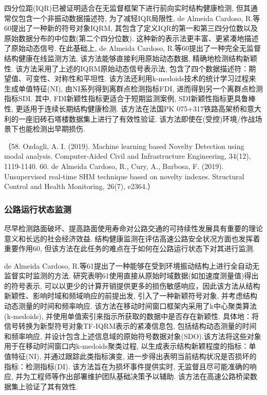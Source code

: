 \documentclass{Style/aas}
\begin{document}
\begin{multicols}{2}
  四分位距(IQR)已被证明适合在无监督框架下进行前向实时结构健康检测, 但其通常仅包含一个非振动数据描述符, 为了减轻IQR局限性,  de Almeida Cardoso, R.等60提出了一种新的符号对象IQRM, 其包含了定义IQR的第一和第三四分位数以及原始数据分布的中位数(第二个四分位数). 这种新的表示法更丰富、更紧凑地描述了原始动态信号. 在此基础上, de Almeida Cardoso, R.等60提出了一种完全无监督结构健康在线监测方法, 该方法能够直接利用原始动态数据, 精确地检测结构新颖性. 该方法采用了上述的IQRM原始动态信号表示法, 包含了四个数据描述符：期望值、可变性、对称性和平坦性. 该方法还利用k-medoids技术的统计学习过程来生成单值特征(NI), 由NI系列得到离群点检测指标FDI, 进而得到另一个离群点检测指标SDI. 其中, FDI新颖性指标更适合于短期监测案例, SDI新颖性指标更具鲁棒性, 更适用于连续长期结构健康检测. 该方法在法国PK 075+317铁路高架桥和意大利的一座旧砖石塔楼数据集上进行了有效性验证. 该方法即使在(受控)环境/作战场景下也能检测出早期损伤.

  （58.	Ozdagli, A. I. (2019). Machine learning based Novelty Detection using modal analysis. Computer‐Aided Civil and Infrastructure Engineering, 34(12), 1119-1140.
  60.	de Almeida Cardoso, R., Cury, A., Barbosa, F. (2019). Unsupervised real‐time SHM technique based on novelty indexes. Structural Control and Health Monitoring, 26(7), e2364.）

  \subsubsection{公路运行状态监测}
  尽早检测路面破坏、提高路面使用寿命对公路交通的可持续性发展具有重要的理论意义和长远的社会经济效益. 结构健康监测在评估高速公路安全状况方面也发挥着重要作用60, 但该方法在此任务的难点在于如何在公路运行状态下对其进行监测.

  de Almeida Cardoso, R.等61提出了一种能够在受到环境振动结构上进行全自动无监督实时监测的方法. 研究表明61使用直接从原始时域数据(如加速度测量值)得出的符号表示, 可以以更少的计算开销提供更多的损伤敏感响应，因此该方法从结构新颖性、影响时域和频域响应的前提出发, 引入了一种新颖符号对象, 并考虑结构动态测量的时间和频率响应. 该方法在移动时间窗口框架内采用了k中心聚类算法(k-medoids), 并使用单值索引来指示所获取的数据中是否存在新颖性. 具体地：将信号转换为新型符号对象TF-IQRM表示的紧凑信息包, 包括结构动态测量的时间和频率响应, 并设计包含上述信息域的原始符号数据对象(SDO).该方法将这些对象用于在移动时间窗口内k-medoids聚类过程, 以生成表示结构新颖程度的指标：单值特征(NI), 并通过跟踪此类指标演变, 进一步得出表明当前结构状况是否损坏的指标：检测指标(DI). 该方法旨在为损坏事件提供实时, 无监督且尽可能准确的响应, 并为工程师等作出部署维护团队基础决策予以辅助. 该方法在高速公路桥梁数据集上验证了其有效性.


\end{multicols}
\end{document}
